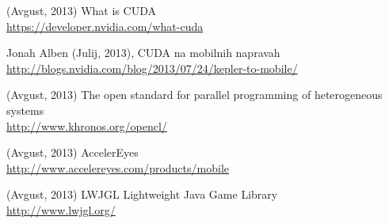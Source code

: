 \begin{thebibliography}{1}
 (Avgust, 2013) What is CUDA
\\ \url{https://developer.nvidia.com/what-cuda}

  Jonah Alben (Julij, 2013), CUDA na mobilnih napravah
\\ \url{http://blogs.nvidia.com/blog/2013/07/24/kepler-to-mobile/}

 (Avgust, 2013) The open standard for parallel programming of heterogeneous systems
\\ \url{http://www.khronos.org/opencl/}

 (Avgust, 2013) AccelerEyes
\\ \url{http://www.accelereyes.com/products/mobile}

 (Avgust, 2013) LWJGL Lightweight Java Game Library
\\ \url{http://www.lwjgl.org/}

\end{thebibliography}


